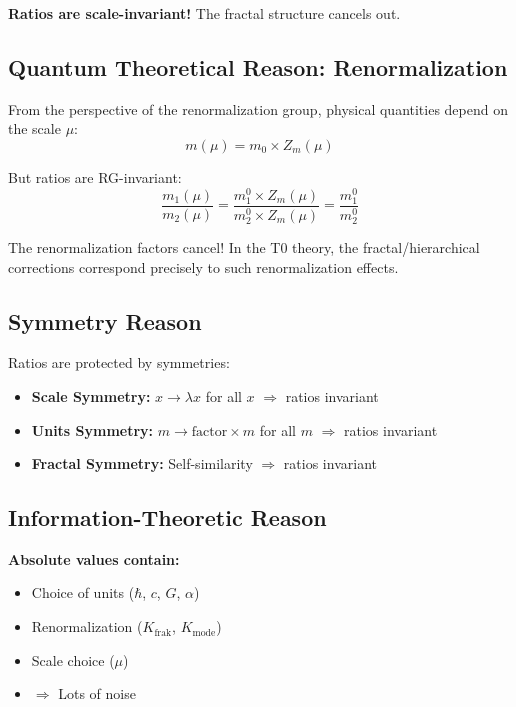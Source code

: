 \textbf{Ratios are scale-invariant!} The fractal structure cancels out.

\subsection{Quantum Theoretical Reason: Renormalization}

From the perspective of the renormalization group, physical quantities depend on the scale $\mu$:
\begin{equation}
	m(\mu) = m_0 \times Z_m(\mu)
\end{equation}

But ratios are RG-invariant:
\begin{equation}
	\frac{m_1(\mu)}{m_2(\mu)} = \frac{m_1^0 \times Z_m(\mu)}{m_2^0 \times Z_m(\mu)} = \frac{m_1^0}{m_2^0}
\end{equation}

The renormalization factors cancel! In the T0 theory, the fractal/hierarchical corrections correspond precisely to such renormalization effects.

\subsection{Symmetry Reason}

Ratios are protected by symmetries:

\begin{itemize}[nosep]
	\item \textbf{Scale Symmetry:} $x \to \lambda x$ for all $x$ $\Rightarrow$ ratios invariant
	\item \textbf{Units Symmetry:} $m \to \text{factor} \times m$ for all $m$ $\Rightarrow$ ratios invariant
	\item \textbf{Fractal Symmetry:} Self-similarity $\Rightarrow$ ratios invariant
\end{itemize}

\subsection{Information-Theoretic Reason}

\textbf{Absolute values contain:}
\begin{itemize}[nosep]
	\item Choice of units ($\hbar$, $c$, $G$, $\alpha$)
	\item Renormalization ($K_\text{frak}$, $K_\text{mode}$)
	\item Scale choice ($\mu$)
	\item $\Rightarrow$ Lots of noise
\end{itemize}

